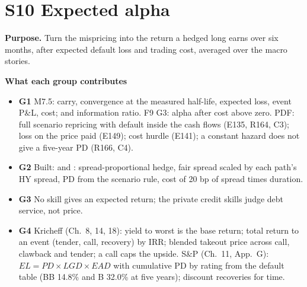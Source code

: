 \documentclass[11pt]{article}
\newcommand{\GA}{\textcolor{gA}{\textbf{G1}}}
\newcommand{\GB}{\textcolor{gB}{\textbf{G2}}}
\newcommand{\GC}{\textcolor{gC}{\textbf{G3}}}
\newcommand{\GD}{\textcolor{gD}{\textbf{G4}}}
\newcommand{\fld}[1]{\par\medskip\noindent\textbf{\textcolor{steel}{#1}}\par\nopagebreak}
\begin{document}
\section{S10 Expected alpha}\label{s10}

\textbf{Purpose.} Turn the mispricing into the return a hedged long earns over six months, after expected default loss and trading cost, averaged over the macro stories.

\fld{What each group contributes}
\begin{itemize}
\item \GA{} M7.5: carry, convergence at the measured half-life, expected loss, event P\&L, cost;  and information ratio. F9 G3: alpha after cost above zero. PDF: full scenario repricing with default inside the cash flows (E135, R164, C3); loss on the price paid (E149); cost hurdle (E141); a constant hazard does not give a five-year PD (R166, C4).
\item \GB{} Built:  and : spread-proportional hedge, fair spread scaled by each path's HY spread, PD from the scenario rule, cost of 20 bp of spread times duration.
\item \GC{} No skill gives an expected return; the private credit skills judge debt service, not price.
\item \GD{} Kricheff (Ch.~8, 14, 18): yield to worst is the base return; total return to an event (tender, call, recovery) by IRR; blended takeout price across call, clawback and tender; a call caps the upside. S\&P (Ch.~11, App.~G): $EL = PD \times LGD \times EAD$ with cumulative PD by rating from the default table (BB 14.8\% and B 32.0\% at five years); discount recoveries for time.
\end{itemize}
\end{document}

